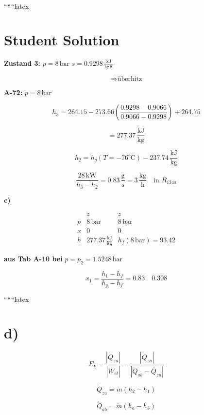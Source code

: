 ``````latex


\section*{Student Solution}

\textbf{Zustand 3:} $p = 8 \, \text{bar}$ \quad $s = 0.9298 \, \frac{\text{kJ}}{\text{kgK}}$

\[
\Rightarrow \text{überhitz}
\]

\textbf{A-72:} \quad $p = 8 \, \text{bar}$

\[
h_3 = 264.15 - 273.66 \left( \frac{0.9298 - 0.9066}{0.9066 - 0.9298} \right) + 264.75
\]

\[
= \boxed{277.37 \, \frac{\text{kJ}}{\text{kg}}}
\]

\[
h_2 = h_g (T = -76^\circ \text{C}) - 237.74 \, \frac{\text{kJ}}{\text{kg}}
\]

\[
\frac{28 \, \text{kW}}{h_3 - h_2} = 0.83 \, \frac{\text{g}}{\text{s}} = \boxed{3 \, \frac{\text{kg}}{\text{h}}} \quad \text{in } R_{134a}
\]

\textbf{c)}

\[
\begin{array}{c|c|c}
 & z & z \\
p & 8 \, \text{bar} & 8 \, \text{bar} \\
x & 0 & 0 \\
h & 277.37 \, \frac{\text{kJ}}{\text{kg}} & h_f (8 \, \text{bar}) = 93.42
\end{array}
\]

\textbf{aus Tab A-10 bei} $p = p_2 = 1.5248 \, \text{bar}$

\[
x_1 = \frac{h_1 - h_f}{h_g - h_f} = \boxed{0.83} \quad \boxed{0.308}
\]

``````latex


\section*{d)}
\begin{equation*}
    E_k = \frac{| \dot{Q}_{zu} |}{| \dot{W}_{el} |} = \frac{| \dot{Q}_{zu} |}{| \dot{Q}_{ab} - \dot{Q}_{zu} |}
\end{equation*}

\begin{equation*}
    \dot{Q}_{zu} = \dot{m} (h_2 - h_1)
\end{equation*}

\begin{equation*}
    \dot{Q}_{ab} = \dot{m} (h_a - h_3)
\end{equation*}

